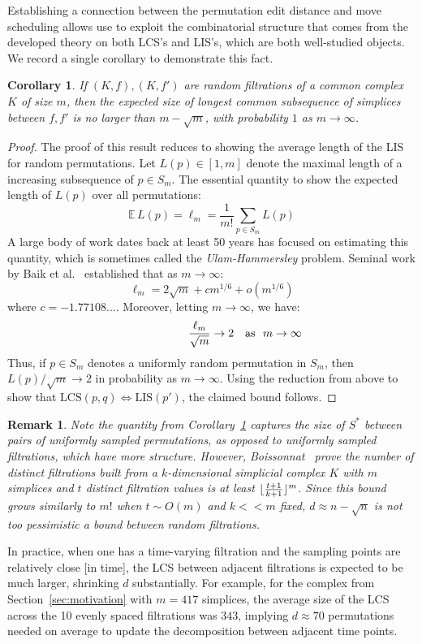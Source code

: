 \documentclass[sn-mathphys]{sn-jnl}
\newtheorem{corollary}{Corollary}
\newtheorem{remark}{Remark}
\DeclarePairedDelimiter\floor{\lfloor}{\rfloor}
\begin{document}
\noindent
Establishing a connection between the permutation edit distance and move scheduling allows use to exploit the combinatorial structure that comes from the developed theory on both LCS's and LIS's, which are both well-studied objects. We record a single corollary to demonstrate this fact. 
\begin{corollary}\label{cor:expectation}
If $(K, f), (K,f')$ are random filtrations of a common complex $K$ of size $m$, then the expected size of longest common subsequence of simplices between $f,f'$ is no larger than $m - \sqrt{m}$, with probability $1$ as $m \to \infty$.
\end{corollary}
\begin{proof} \normalsize
	The proof of this result reduces to showing the average length of the LIS for random permutations. Let $L(p) \in [1,m]$ denote the maximal length of a increasing subsequence of $p \in S_m$. 
	The essential quantity to show the expected length of $L(p)$ over all permutations: 
	$$ \mathbb{E} \, L(p) = \ell_m = \frac{1}{m!} \sum\limits_{p \in S_m} L(p)$$
	A large body of work dates back at least 50 years has focused on estimating this quantity, which is sometimes called the \emph{Ulam-Hammersley} problem. Seminal work by Baik et al.~\cite{baik1999distribution} established that as $m \to \infty$:
	$$ \displaystyle \ell_m = 2 \sqrt{m} + c m^{1/6} + o(m^{1/6}) $$
where $c = -1.77108...$. Moreover, letting $m \to \infty$, we have: 
$$ \frac{\ell_m}{\sqrt{m}} \to 2\rlap{\quad \text{as } $m \to \infty$} $$	 
Thus, if $p \in S_m$ denotes a uniformly random permutation in $S_m$, then $L(p)/\sqrt{m} \to 2$ in probability as $m \to \infty$. Using the reduction from above to show that $\mathrm{LCS}(p,q) \Leftrightarrow \mathrm{LIS}(p')$, the claimed bound follows.
\end{proof}
\begin{remark}
\noindent Note the quantity from Corollary~\ref{cor:expectation} captures the size of $S^\ast$ between pairs of uniformly sampled permutations, as opposed to uniformly sampled filtrations, which have more structure. 
However, Boissonnat~\cite{boissonnat2018efficient} prove the number of distinct filtrations built from a $k$-dimensional simplicial complex $K$ with $m$ simplices and $t$ distinct filtration values is \emph{at least} $\floor{\frac{t+1}{k+1}}^m$. 
Since this bound grows similarly to $m!$ when $t \sim O(m)$ and $k << m$ fixed, $d \approx n - \sqrt{n}$ is not too pessimistic a bound between random filtrations.     
\end{remark}
\noindent 
In practice, when one has a time-varying filtration and the sampling points are relatively close [in time], the LCS between adjacent filtrations is expected to be much larger, shrinking $d$ substantially. 
For example, for the complex from Section~\ref{sec:motivation} with $m=417$ simplices, the average size of the LCS across the 10 evenly spaced filtrations was $343$, implying $d \approx 70$ permutations needed on average to update the decomposition between adjacent time points.
 
\end{document}
